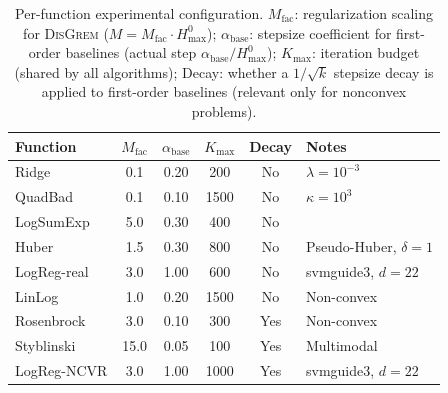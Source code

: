 \documentclass[review,onefignum,onetabnum]{siamart171218}
\begin{document}
	\begin{table}[htbp]
		\centering
		\caption{Per-function experimental configuration.
			$M_{\mathrm{fac}}$: regularization scaling for \textsc{DisGrem}
			($M = M_{\mathrm{fac}}\cdot H_{\max}^{0}$);
			$\alpha_{\mathrm{base}}$: stepsize coefficient for first-order
			baselines (actual step $\alpha_{\mathrm{base}}/H_{\max}^{0}$);
			$K_{\max}$: iteration budget (shared by all algorithms);
			Decay: whether a $1/\sqrt{k}$ stepsize decay is applied to
			first-order baselines (relevant only for nonconvex problems).}
		\label{tab:config}
		\setlength{\tabcolsep}{5pt}
		\small
		\begin{tabular}{lccccl}
			\toprule
			Function & $M_{\mathrm{fac}}$ & $\alpha_{\mathrm{base}}$ & $K_{\max}$ & Decay & Notes \\
			\midrule
			Ridge       & 0.1  & 0.20 &  200 & No  & $\lambda{=}10^{-3}$ \\
			QuadBad     & 0.1  & 0.10 & 1500 & No  & $\kappa{=}10^3$ \\
			LogSumExp   & 5.0  & 0.30 &  400 & No  & \\
			Huber       & 1.5  & 0.30 &  800 & No  & Pseudo-Huber, $\delta{=}1$ \\
			LogReg-real & 3.0  & 1.00 &  600 & No  & svmguide3, $d{=}22$ \\
			LinLog      & 1.0  & 0.20 & 1500 & No  & Non-convex \\
			Rosenbrock  & 3.0  & 0.10 &  300 & Yes & Non-convex \\
			Styblinski  & 15.0 & 0.05 &  100 & Yes & Multimodal \\
			LogReg-NCVR & 3.0  & 1.00 & 1000 & Yes & svmguide3, $d{=}22$ \\
			\bottomrule
		\end{tabular}
	\end{table}
	
\end{document}
